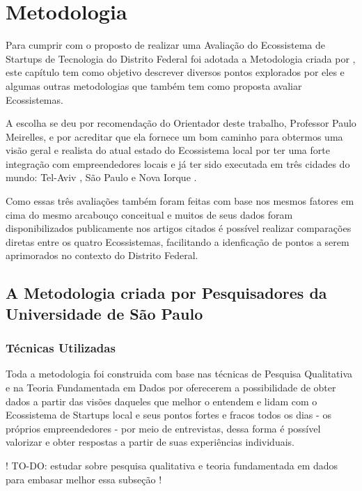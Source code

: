 \chapter[Metodologia]{Metodologia}
\label{cap-metodologia}

Para cumprir com o proposto de realizar uma Avaliação do Ecossistema de Startups de Tecnologia do Distrito Federal foi adotada a Metodologia criada por \cite{kon2015}, este capítulo tem como objetivo descrever diversos pontos explorados por eles e algumas outras metodologias que também tem como proposta avaliar Ecossistemas.

A escolha se deu por recomendação do Orientador deste trabalho, Professor Paulo Meirelles, e por acreditar que ela fornece um bom caminho para obtermos uma visão geral e realista do atual estado do Ecossistema local por ter uma forte integração com empreendedores locais e já ter sido executada em três cidades do mundo: Tel-Aviv \cite{kon2014}, São Paulo \cite{monna2015} e Nova Iorque \cite{cukier2016}. 

Como essas três avaliações também foram feitas com base nos mesmos fatores em cima do mesmo arcabouço conceitual e muitos de seus dados foram disponibilizados publicamente nos artigos citados é possível realizar comparações diretas entre os quatro Ecossistemas, facilitando a idenficação de pontos a serem aprimorados no contexto do Distrito Federal.

\section{A Metodologia criada por Pesquisadores da Universidade de São Paulo}
\label{section:metodologia_de_avaliacao_adotada}

\subsection{Técnicas Utilizadas}
\label{subsection:tecnicas_utilizadas}

Toda a metodologia foi construida com base nas técnicas de Pesquisa Qualitativa e na Teoria Fundamentada em Dados por oferecerem a possibilidade de obter dados a partir das visões daqueles que melhor o entendem e lidam com o Ecossistema de Startups local e seus pontos fortes e fracos todos os dias - os próprios empreendedores - por meio de entrevistas, dessa forma é possível valorizar e obter respostas a partir de suas experiências individuais.

! TO-DO: estudar sobre pesquisa qualitativa e teoria fundamentada em dados para embasar melhor essa subseção !

